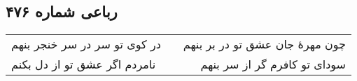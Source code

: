 \begin{center}
\section*{رباعی شماره ۴۷۶}
\label{sec:sh476}
\begin{longtable}{l p{0.5cm} r}
در کوی تو سر در سر خنجر بنهم
&&
چون مهرهٔ جان عشق تو در بر بنهم
\\
نامردم اگر عشق تو از دل بکنم
&&
سودای تو کافرم گر از سر بنهم
\\
\end{longtable}
\end{center}
